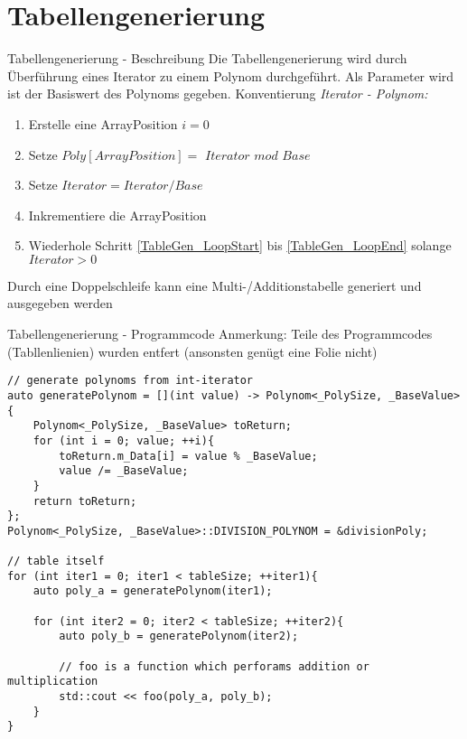 \documentclass{beamer}
\begin{document}
	\section{Tabellengenerierung}
    \begin{frame}{Tabellengenerierung - \newline Beschreibung}\label{Page_TabelGen}
	    Die Tabellengenerierung wird durch Überführung eines Iterator zu einem Polynom durchgeführt. \newline
	    Als Parameter wird ist der Basiswert des Polynoms gegeben. \newline
    	Konventierung \textit{Iterator - Polynom:}
    	\begin{enumerate}
    		\item Erstelle eine ArrayPosition $i = 0$
    		\item Setze $Poly[ArrayPosition] =$ $Iterator$ $mod$ $Base$ \label{TableGen_LoopStart}
    		\item Setze $Iterator = Iterator / Base$
    		\item Inkrementiere die ArrayPosition \label{TableGen_LoopEnd}
    		\item Wiederhole Schritt \ref*{TableGen_LoopStart} bis \ref*{TableGen_LoopEnd} solange $Iterator > 0$
    	\end{enumerate}
    	Durch eine Doppelschleife kann eine Multi-/Additionstabelle generiert und ausgegeben werden
    \end{frame}
    
    \begin{frame}[fragile]{Tabellengenerierung - \newline Programmcode}
	    Anmerkung: Teile des Programmcodes (Tabllenlienien) \newline wurden entfert (ansonsten genügt eine Folie nicht)
    	\begin{lstlisting}[style=numbers]
// generate polynoms from int-iterator
auto generatePolynom = [](int value) -> Polynom<_PolySize, _BaseValue>{
    Polynom<_PolySize, _BaseValue> toReturn;
    for (int i = 0; value; ++i){
        toReturn.m_Data[i] = value % _BaseValue;
        value /= _BaseValue;
    }
    return toReturn;
};
Polynom<_PolySize, _BaseValue>::DIVISION_POLYNOM = &divisionPoly;

// table itself
for (int iter1 = 0; iter1 < tableSize; ++iter1){
    auto poly_a = generatePolynom(iter1);

    for (int iter2 = 0; iter2 < tableSize; ++iter2){
        auto poly_b = generatePolynom(iter2);

        // foo is a function which perforams addition or multiplication
        std::cout << foo(poly_a, poly_b);
    }
}
\end{lstlisting}
\end{frame}
\end{document}

